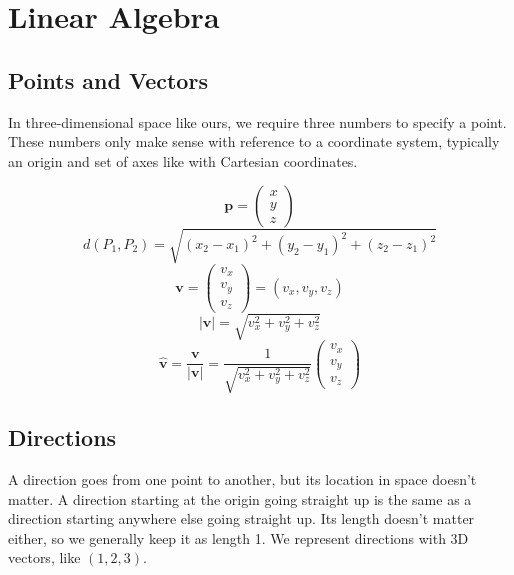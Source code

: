 \section{Linear Algebra}

\subsection{Points and Vectors}
In three-dimensional space like ours, we require three numbers to
specify a point. These numbers only make sense with reference to
a coordinate system, typically an origin and set of axes like with
Cartesian coordinates.

\begin{equation}\mathbf{p} = \begin{pmatrix} x \\ y \\ z \end{pmatrix}\end{equation}
\begin{equation}d(P_1, P_2) = \sqrt{(x_2 - x_1)^2 + (y_2 - y_1)^2 + (z_2 - z_1)^2}\end{equation}
\begin{equation}\mathbf{v} = \begin{pmatrix} v_x \\ v_y \\ v_z \end{pmatrix} = (v_x, v_y, v_z)\end{equation}
\begin{equation}|\mathbf{v}| = \sqrt{v_x^2 + v_y^2 + v_z^2}\end{equation}
\begin{equation}\hat{\mathbf{v}} = \frac{\mathbf{v}}{|\mathbf{v}|} = \frac{1}{\sqrt{v_x^2 + v_y^2 + v_z^2}}\begin{pmatrix} v_x \\ v_y \\ v_z \end{pmatrix}\end{equation}

\subsection{Directions}
A direction goes from one point to another, but its location
in space doesn't matter. A direction starting at the origin
going straight up is the same as a direction starting anywhere
else going straight up. Its length doesn't matter either, so
we generally keep it as length 1. We represent directions
with 3D vectors, like $(1, 2, 3)$.

